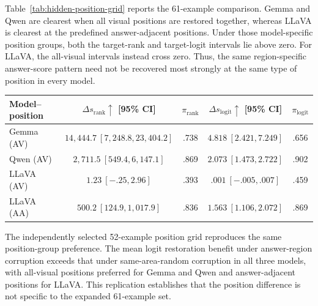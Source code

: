 Table~\ref{tab:hidden-position-grid} reports the 61-example comparison. Gemma and Qwen are clearest when all visual positions are restored together, whereas LLaVA is clearest at the predefined answer-adjacent positions. Under those model-specific position groups, both the target-rank and target-logit intervals lie above zero. For LLaVA, the all-visual intervals instead cross zero. Thus, the same region-specific answer-score pattern need not be recovered most strongly at the same type of position in every model.

\begin{center}
\begin{minipage}{\linewidth}
\captionsetup{type=table,hypcap=false}
\centering
\caption{\textbf{Hidden restoration recovers target-answer scores at different position groups.} Entries report the restoration benefit under answer-region corruption minus that under matched same-area random corruption on 61 examples. $\Delta s$ is the mean score change, $\pi$ the positive-sample fraction, and brackets the 95\% sample-bootstrap interval. AV denotes all visual positions pooled together and AA denotes answer-adjacent positions. Rank changes are interpreted within model because vocabulary sizes differ.}
\label{tab:hidden-position-grid}
\normalsize
\begin{tabular*}{\linewidth}{@{\extracolsep{\fill}}lcccc@{}}
\toprule
Model--position & $\Delta s_{\mathrm{rank}}\uparrow$ [95\% CI] & $\pi_{\mathrm{rank}}$ & $\Delta s_{\mathrm{logit}}\uparrow$ [95\% CI] & $\pi_{\mathrm{logit}}$ \\
\midrule
Gemma (AV) & $14{,}444.7\ [7{,}248.8,23{,}404.2]$ & .738 & $4.818\ [2.421,7.249]$ & .656 \\
Qwen (AV) & $2{,}711.5\ [549.4,6{,}147.1]$ & .869 & $2.073\ [1.473,2.722]$ & .902 \\
LLaVA (AV) & $1.23\ [-.25,2.96]$ & .393 & $.001\ [-.005,.007]$ & .459 \\
LLaVA (AA) & $500.2\ [124.9,1{,}017.9]$ & .836 & $1.563\ [1.106,2.072]$ & .869 \\
\bottomrule
\end{tabular*}
\end{minipage}
\end{center}

The independently selected 52-example position grid reproduces the same position-group preference. The mean logit restoration benefit under answer-region corruption exceeds that under same-area-random corruption in all three models, with all-visual positions preferred for Gemma and Qwen and answer-adjacent positions for LLaVA. This replication establishes that the position difference is not specific to the expanded 61-example set.


